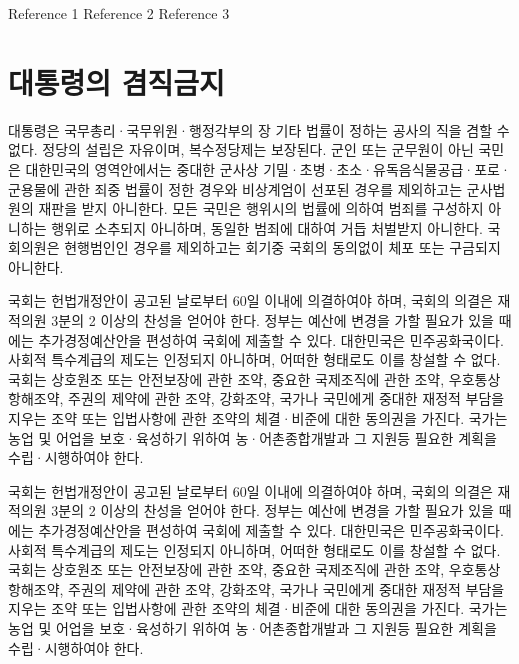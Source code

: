 \documentclass[doctor, korean]{pnuthesis}
\begin{document}
%
%

\begin{thebibliography}{00}
	 Reference 1
	 Reference 2
	 Reference 3
\end{thebibliography}

\appendix
\chapter{대통령의 겸직금지}

대통령은 국무총리·국무위원·행정각부의 장 기타 법률이 정하는 공사의 직을 겸할 수 없다. 정당의 설립은 자유이며, 복수정당제는 보장된다. 군인 또는 군무원이 아닌 국민은 대한민국의 영역안에서는 중대한 군사상 기밀·초병·초소·유독음식물공급·포로·군용물에 관한 죄중 법률이 정한 경우와 비상계엄이 선포된 경우를 제외하고는 군사법원의 재판을 받지 아니한다. 모든 국민은 행위시의 법률에 의하여 범죄를 구성하지 아니하는 행위로 소추되지 아니하며, 동일한 범죄에 대하여 거듭 처벌받지 아니한다. 국회의원은 현행범인인 경우를 제외하고는 회기중 국회의 동의없이 체포 또는 구금되지 아니한다.

국회는 헌법개정안이 공고된 날로부터 60일 이내에 의결하여야 하며, 국회의 의결은 재적의원 3분의 2 이상의 찬성을 얻어야 한다. 정부는 예산에 변경을 가할 필요가 있을 때에는 추가경정예산안을 편성하여 국회에 제출할 수 있다. 대한민국은 민주공화국이다. 사회적 특수계급의 제도는 인정되지 아니하며, 어떠한 형태로도 이를 창설할 수 없다. 국회는 상호원조 또는 안전보장에 관한 조약, 중요한 국제조직에 관한 조약, 우호통상항해조약, 주권의 제약에 관한 조약, 강화조약, 국가나 국민에게 중대한 재정적 부담을 지우는 조약 또는 입법사항에 관한 조약의 체결·비준에 대한 동의권을 가진다. 국가는 농업 및 어업을 보호·육성하기 위하여 농·어촌종합개발과 그 지원등 필요한 계획을 수립·시행하여야 한다.

\pagebreak
\acknowledgement %

국회는 헌법개정안이 공고된 날로부터 60일 이내에 의결하여야 하며, 국회의 의결은 재적의원 3분의 2 이상의 찬성을 얻어야 한다. 정부는 예산에 변경을 가할 필요가 있을 때에는 추가경정예산안을 편성하여 국회에 제출할 수 있다. 대한민국은 민주공화국이다. 사회적 특수계급의 제도는 인정되지 아니하며, 어떠한 형태로도 이를 창설할 수 없다. 국회는 상호원조 또는 안전보장에 관한 조약, 중요한 국제조직에 관한 조약, 우호통상항해조약, 주권의 제약에 관한 조약, 강화조약, 국가나 국민에게 중대한 재정적 부담을 지우는 조약 또는 입법사항에 관한 조약의 체결·비준에 대한 동의권을 가진다. 국가는 농업 및 어업을 보호·육성하기 위하여 농·어촌종합개발과 그 지원등 필요한 계획을 수립·시행하여야 한다.
\end{document}
